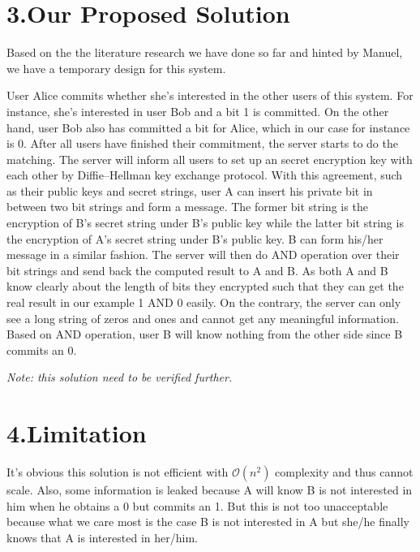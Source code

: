 \documentclass{article}
\begin{document}
\section{3.\hspace*{0.5em}Our Proposed Solution}\label{sec-our-proposed-solution}%

\noindent{}Based on the the literature research we have done so far and hinted by Manuel, we have a temporary design for this system.%

User Alice commits whether she's interested in the other users of this system. For instance, she's interested in user Bob and a bit 1 is committed. On the other hand, user Bob also has committed a bit for Alice, which in our case for instance is 0. After all users have finished their commitment, the server starts to do the matching. The server will inform all users to set up an secret encryption key with each other by Diffie–Hellman key exchange protocol. With this agreement, such as their public keys and secret strings, user A can insert his private bit in between two bit strings and form a message. The former bit string is the encryption of B's secret string under B's public key while the latter bit string is the encryption of A's secret string under B's public key. B can form his/her message in a similar fashion. The server will then do AND operation over their bit strings and send back the computed result to A and B. As both A and B know clearly about the length of bits they encrypted such that they can get the real result in our example 1 AND 0 easily. On the contrary, the server can only see a long string of zeros and ones and cannot get any meaningful information. Based on AND operation, user B will know nothing from the other side since B commits an 0.%

\emph{Note: this solution need to be verified further.}%

\section{4.\hspace*{0.5em}Limitation}\label{sec-limitation}%

\noindent{}It's obvious this solution is not efficient with $\mathcal{O}(n^2)$ complexity and thus cannot scale. Also, some information is leaked because A will know B is not interested in him when he obtains a 0 but commits an 1. But this is not too unacceptable because what we care most is the case B is not interested in A but she/he finally knows that A is interested in her/him.%
\end{document}
